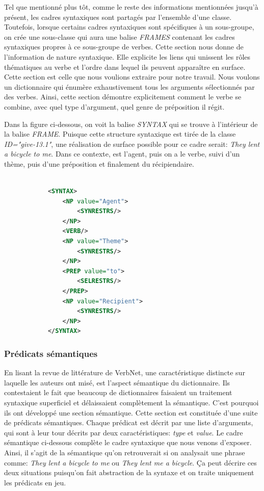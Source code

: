 Tel que mentionné plus tôt, comme le reste des informations mentionnées jusqu'à présent, les cadres syntaxiques sont partagés par l'ensemble d'une classe. Toutefois, lorsque certains cadres syntaxiques sont spécifiques à un sous-groupe, on crée une sous-classe qui aura une balise \emph{FRAMES} contenant les cadres syntaxiques propres à ce sous-groupe de verbes. Cette section nous donne de l'information de nature syntaxique. Elle explicite les liens qui unissent les rôles thématiques au verbe et l'ordre dans lequel ils peuvent apparaître en surface. Cette section est celle que nous voulions extraire pour notre travail. Nous voulons un dictionnaire qui énumère exhaustivement tous les arguments sélectionnés par des verbes. Ainsi, cette section démontre explicitement comment le verbe se combine, avec quel type d'argument, quel genre de préposition il régit.

Dans la figure ci-dessous, on voit la balise \emph{SYNTAX} qui se trouve à l'intérieur de la balise \emph{FRAME}. Puisque cette structure syntaxique est tirée de la classe \emph{ID="give-13.1"}, une réalisation de surface possible pour ce cadre serait: \emph{They lent a bicycle to me}. Dans ce contexte,  est l'agent, puis on a le verbe, suivi d'un thème, puis d'une préposition et finalement du récipiendaire.

\begin{lstlisting}[language=Xml, caption = cadres syntaxiques]

            <SYNTAX>
                <NP value="Agent">
                    <SYNRESTRS/>
                </NP>
                <VERB/>
                <NP value="Theme">
                    <SYNRESTRS/>
                </NP>
                <PREP value="to">
                    <SELRESTRS/>
                </PREP>
                <NP value="Recipient">
                    <SYNRESTRS/>
                </NP>
            </SYNTAX>
\end{lstlisting}

\subsubsection{Prédicats sémantiques}

En lisant la revue de littérature de VerbNet, une caractéristique distincte sur laquelle les auteurs ont misé, est l'aspect sémantique du dictionnaire. Ils contestaient le fait que beaucoup de dictionnaires faisaient un traitement syntaxique superficiel et délaissaient complètement la sémantique. C'est pourquoi ils ont développé une section sémantique. Cette section est constituée d'une suite de prédicats sémantiques. Chaque prédicat est décrit par une liste d'arguments, qui sont à leur tour décrits par deux caractéristiques: \emph{type} et \emph{value}.  Le cadre sémantique ci-dessous complète le cadre syntaxique que nous venons d'exposer. Ainsi, il s'agit de la sémantique qu'on retrouverait si on analysait une phrase comme: \emph{They lent a bicycle to me} ou \emph{They lent me a bicycle}. Ça peut décrire ces deux situations puisqu'on fait abstraction de la syntaxe et on traite uniquement les prédicats en jeu.

